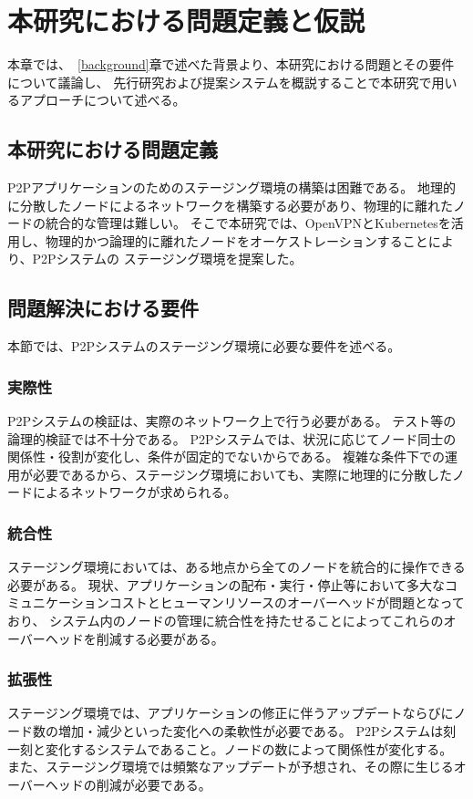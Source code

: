 \chapter{本研究における問題定義と仮説}
\label{issue}

本章では、~\ref{background}章で述べた背景より、本研究における問題とその要件について議論し、
先行研究および提案システムを概説することで本研究で用いるアプローチについて述べる。

\section{本研究における問題定義}
P2Pアプリケーションのためのステージング環境の構築は困難である。
地理的に分散したノードによるネットワークを構築する必要があり、物理的に離れたノードの統合的な管理は難しい。
そこで本研究では、OpenVPNとKubernetesを活用し、物理的かつ論理的に離れたノードをオーケストレーションすることにより、P2Pシステムの
ステージング環境を提案した。

\section{問題解決における要件}
\label{issue:requirements}
本節では、P2Pシステムのステージング環境に必要な要件を述べる。

\subsection{実際性}
P2Pシステムの検証は、実際のネットワーク上で行う必要がある。
テスト等の論理的検証では不十分である。
P2Pシステムでは、状況に応じてノード同士の関係性・役割が変化し、条件が固定的でないからである。
複雑な条件下での運用が必要であるから、ステージング環境においても、実際に地理的に分散したノードによるネットワークが求められる。

\subsection{統合性}
ステージング環境においては、ある地点から全てのノードを統合的に操作できる必要がある。
現状、アプリケーションの配布・実行・停止等において多大なコミュニケーションコストとヒューマンリソースのオーバーヘッドが問題となっており、
システム内のノードの管理に統合性を持たせることによってこれらのオーバーヘッドを削減する必要がある。

\subsection{拡張性}
ステージング環境では、アプリケーションの修正に伴うアップデートならびにノード数の増加・減少といった変化への柔軟性が必要である。
P2Pシステムは刻一刻と変化するシステムであること。ノードの数によって関係性が変化する。
また、ステージング環境では頻繁なアップデートが予想され、その際に生じるオーバーヘッドの削減が必要である。

